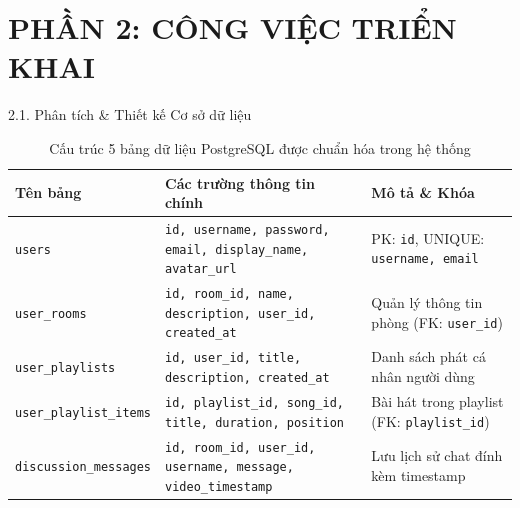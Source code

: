 \documentclass[aspectratio=169,11pt]{beamer}
\begin{document}
\section{PHẦN 2: CÔNG VIỆC TRIỂN KHAI}

\begin{frame}{2.1. Phân tích \& Thiết kế Cơ sở dữ liệu}
    \begin{table}[h!]
    \centering
    \small
    \begin{tabular}{|p{3.2cm}|p{5.2cm}|p{4.5cm}|}
    \hline
    \textbf{Tên bảng} & \textbf{Các trường thông tin chính} & \textbf{Mô tả \& Khóa} \\ \hline
    \texttt{users} & \texttt{id, username, password, email, display\_name, avatar\_url} & PK: \texttt{id}, UNIQUE: \texttt{username, email} \\ \hline
    \texttt{user\_rooms} & \texttt{id, room\_id, name, description, user\_id, created\_at} & Quản lý thông tin phòng (FK: \texttt{user\_id}) \\ \hline
    \texttt{user\_playlists} & \texttt{id, user\_id, title, description, created\_at} & Danh sách phát cá nhân người dùng \\ \hline
    \texttt{user\_playlist\_items} & \texttt{id, playlist\_id, song\_id, title, duration, position} & Bài hát trong playlist (FK: \texttt{playlist\_id}) \\ \hline
    \texttt{discussion\_messages} & \texttt{id, room\_id, user\_id, username, message, video\_timestamp} & Lưu lịch sử chat đính kèm timestamp \\ \hline
    \end{tabular}
    \caption{Cấu trúc 5 bảng dữ liệu PostgreSQL được chuẩn hóa trong hệ thống}
    \end{table}
\end{frame}
\end{document}
